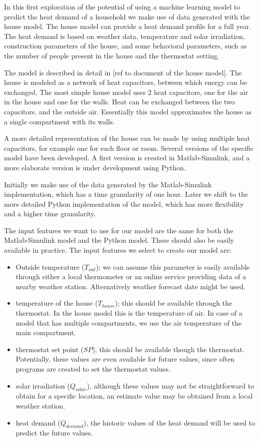 In this first exploration of the potential of using a machine learning model to predict the heat demand of a household we make use of data generated with the house model. The house model can provide a heat demand profile for a full year. The heat demand is based on weather data, temperature and solar irradiation, construction parameters of the house, and some behavioral parameters, such as the number of people present in the house and the thermostat setting.   

The model is described in detail in [ref to document of the house model]. The house is modeled as a network of heat capacitors, between which energy can be exchanged. The most simple house model uses 2 heat capacitors, one for the air in the house and one for the walls. Heat can be exchanged between the two capacitors, and the outside air. Essentially this model approximates the house as a single compartment with its walls. 

A more detailed representation of the house can be made by using multiple heat capacitors, for example one for each floor or room.   
Several versions of the specific model have been developed. A first version is created in Matlab-Simulink, and a more elaborate version is under development using Python. 

Initially we make use of the data generated by the Matlab-Simulink implementation, which has a time granularity of one hour. Later we shift to the more detailed Python implementation of the model, which has more flexibility and a higher time granularity.

The input features we want to use for our model are the same for both the Matlab-Simulink model and the Python model. These should also be easily available in practice. The input features we select to create our model are:
\begin{itemize}
\item Outside temperature ($T_{out}$); we can assume this parameter is easily available through either a local thermometer or an online service providing data of a nearby weather station. Alternatively weather forecast date might be used. 
\item temperature of the house ($T_{house}$); this should be available through the thermostat. In the house model this is the temperature of air. In case of a model that has multiple compartments, we use the air temperature of the main compartment.
\item thermostat set point ($SP$), this should be available though the thermostat. Potentially, these values are even available for future values, since often programs are created to set the thermostat values. 
\item solar irradiation ($Q_{solar}$), although these values may not be straightforward to obtain for a specific location, an estimate value may be obtained from a local weather station. 
\item heat demand ($Q_{demand}$), the historic values of the heat demand will be used to predict the future values. 
\end{itemize}


